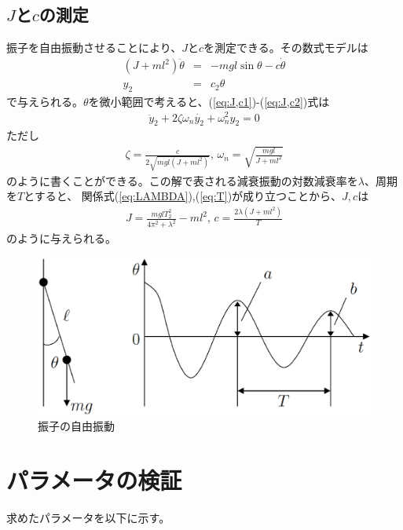 \documentclass[a4j,11pt,twoside]{jbook}
\begin{document}
\subsection{$J$と$c$の測定}
振子を自由振動させることにより、$J$と$c$を測定できる。その数式モデルは
\begin{eqnarray}
(J+ml^2)\ddot{\theta} & = & -mgl\sin{\theta} - c\dot{\theta}
\label{eq:J,c1}\\
y_2 & = & c_2\theta
\label{eq:J,c2}
\end{eqnarray}
で与えられる。$\theta$を微小範囲で考えると、(\ref{eq:J,c1})-(\ref{eq:J,c2})式は
\begin{eqnarray}
	\ddot{y}_2 + 2\zeta\omega_n\dot{y_2} + \omega_n^2y_2 = 0
\end{eqnarray}
ただし
\begin{eqnarray}
	\zeta = \frac{c}{2\sqrt{mgl(J + ml^2)}},\,
	\omega_n = \sqrt{\frac{mgl}{J + ml^2}}
\end{eqnarray}
のように書くことができる。この解で表される減衰振動の対数減衰率を$\lambda$、周期を$T$とすると、
関係式(\ref{eq:LAMBDA}),(\ref{eq:T})が成り立つことから、$J,c$は
\begin{eqnarray}
J = \frac{mglT_2^2}{4\pi^2 + \lambda^2} - ml^2 ,\, c = \frac{2\lambda(J +
	ml^2)}{T}
\end{eqnarray}
のように与えられる。

\clearpage

\begin{figure}[htbp]
	\begin{center}
		\includegraphics[width = 0.7 \linewidth]{measure_jc.eps}
		\caption{振子の自由振動}
		\label{fig:振子の自由振動}
	\end{center}
\end{figure}


\section{パラメータの検証}
求めたパラメータを以下に示す。
\end{document}

